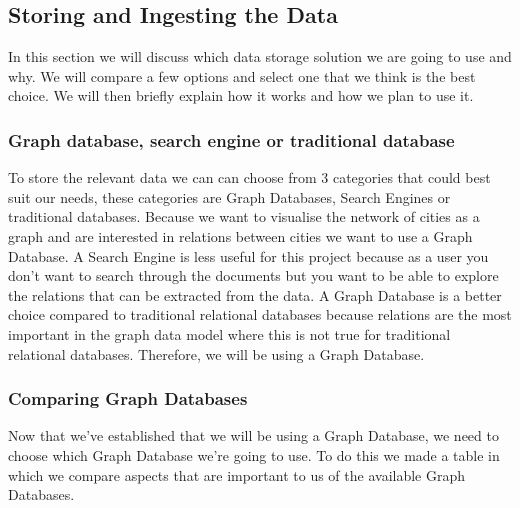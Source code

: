 \subsection{Storing and Ingesting the Data}
In this section we will discuss which data storage solution we are going to use and why. We will compare a few options and select one that we think is the best choice. We will then briefly explain how it works and how we plan to use it.

\subsubsection{Graph database, search engine or traditional database}
To store the relevant data we can can choose from 3 categories that could best suit our needs, these categories are Graph Databases, Search Engines or traditional databases. Because we want to visualise the network of cities as a graph and are interested in relations between cities we want to use a Graph Database. A Search Engine is less useful for this project because as a user you don't want to search through the documents but you want to be able to explore the relations that can be extracted from the data. A Graph Database is a better choice compared to traditional relational databases because relations are the most important in the graph data model where this is not true for traditional relational databases. Therefore, we will be using a Graph Database.

\subsubsection{Comparing Graph Databases}
Now that we've established that we will be using a Graph Database, we need to choose which Graph Database we're going to use. To do this we made a table in which we compare aspects that are important to us of the available Graph Databases.\\


